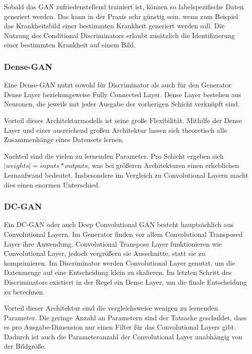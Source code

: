 Sobald das \acrshort{GAN} zufriedenstellend trainiert ist, können so labelspezifische Daten generiert werden.
Das kann in der Praxis sehr günstig sein, wenn zum Beispiel das Krankheitsbild einer bestimmten Krankheit generiert werden soll.
Die Nutzung des Conditional Discriminators erlaubt zusätzlich die Identifizierung einer bestimmten Krankheit auf einem Bild.

\subsubsection{Dense-GAN}
Eine Dense-GAN nutzt sowohl für Discriminator als auch für den Generator Dense Layer beziehungsweise Fully Connected Layer.
Dense Layer bestehen aus Neuronen, die jeweils mit jeder Ausgabe der vorherigen Schicht verknüpft sind.
\newline

Vorteil dieses Architekturmodells ist seine große Flexibilität.
Mithilfe der Dense Layer und einer ausreichend großen Architektur lassen sich theoretisch alle Zusammenhänge eines Datensets lernen.
\newline

Nachteil sind die vielen zu lernenden Parameter.
Pro Schicht ergeben sich $|weights| = inputs * outputs$, was bei größeren Architekturen einen erheblichen Lernaufwand bedeutet.
Insbesondere im Vergleich zu Convolutional Layern macht dies einen enormen Unterschied.

\subsubsection{DC-GAN}
Ein DC-GAN oder auch Deep Convolutional GAN besteht hauptsächlich aus Convolutional Layern.
Im Generator finden vor allem Convolutional Transposed Layer ihre Anwendung.
Convolutional Transpose Layer funktionieren wie Convolutional Layer, jedoch vergrößern sie Ausschnitte, statt sie zu komprimieren.
Im Discriminator werden Convolutional Layer genutzt, um die Datenmenge auf eine Entscheidung klein zu skalieren.
Im letzten Schritt des Discriminators existiert in der Regel ein Dense Layer, um die finale Entscheidung zu berechnen.
\newline

Vorteil dieser Architektur sind die vergleichsweise wenigen zu lernenden Parameter.
Die geringe Anzahl an Parametern sind der Tatsache geschuldet, dass es pro Ausgabe-Dimension nur einen Filter für das Convolutional Layers gibt.
Dadurch ist auch die Parameteranzahl der Convolutional Layer unabhängig von der Bildgröße.


